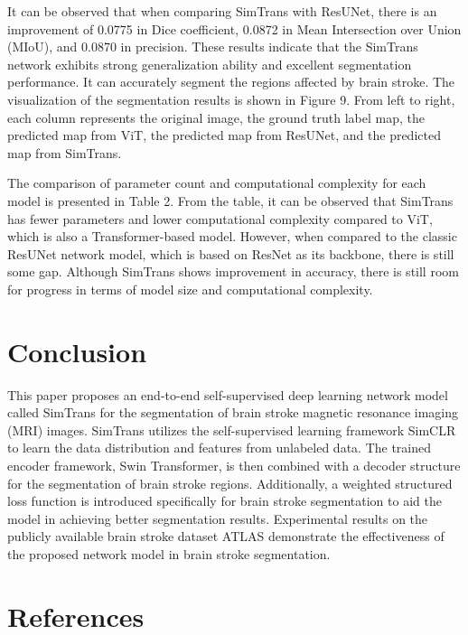 \documentclass[10pt,twocolumn,letterpaper]{article}
\begin{document}
It can be observed that when comparing SimTrans with ResUNet, there is an improvement of 0.0775 in Dice coefficient, 0.0872 in Mean Intersection over Union (MIoU), and 0.0870 in precision. These results indicate that the SimTrans network exhibits strong generalization ability and excellent segmentation performance. It can accurately segment the regions affected by brain stroke. The visualization of the segmentation results is shown in Figure 9. From left to right, each column represents the original image, the ground truth label map, the predicted map from ViT, the predicted map from ResUNet, and the predicted map from SimTrans.

The comparison of parameter count and computational complexity for each model is presented in Table 2. From the table, it can be observed that SimTrans has fewer parameters and lower computational complexity compared to ViT, which is also a Transformer-based model. However, when compared to the classic ResUNet network model, which is based on ResNet as its backbone, there is still some gap. Although SimTrans shows improvement in accuracy, there is still room for progress in terms of model size and computational complexity.


\section{Conclusion}
\label{sec:conclusion}

This paper proposes an end-to-end self-supervised deep learning network model called SimTrans for the segmentation of brain stroke magnetic resonance imaging (MRI) images. SimTrans utilizes the self-supervised learning framework SimCLR to learn the data distribution and features from unlabeled data. The trained encoder framework, Swin Transformer, is then combined with a decoder structure for the segmentation of brain stroke regions. Additionally, a weighted structured loss function is introduced specifically for brain stroke segmentation to aid the model in achieving better segmentation results. Experimental results on the publicly available brain stroke dataset ATLAS demonstrate the effectiveness of the proposed network model in brain stroke segmentation.

\section{References}
\label{sec:references}
\end{document}
